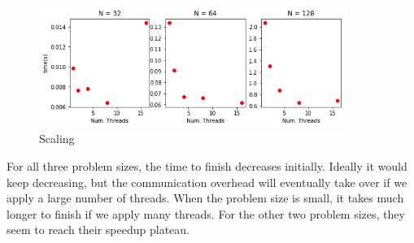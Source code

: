 \documentclass{amsart} %
\begin{document}
\begin{figure}[!htb]
	\includegraphics[width=100mm]{scaling.png}
	\caption{Scaling}
	\label{fig:scaling}
\end{figure}
\FloatBarrier

For all three problem sizes, the time to finish decreases initially. Ideally it would keep decreasing, but the communication overhead will eventually take over if we apply a large number of threads. When the problem size is small, it takes much longer to finish if we apply many threads. For the other two problem sizes, they seem to reach their speedup plateau.  

\end{document}
